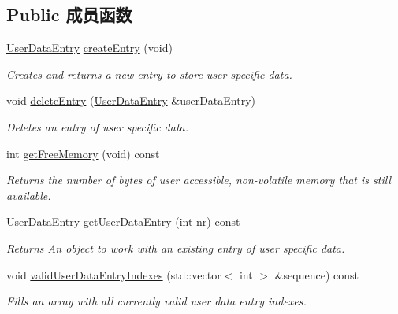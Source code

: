\subsection*{Public 成员函数}
\begin{DoxyCompactItemize}
\item 
\hyperlink{classmv_i_m_p_a_c_t_1_1acquire_1_1_user_data_entry}{User\+Data\+Entry} \hyperlink{classmv_i_m_p_a_c_t_1_1acquire_1_1_user_data_a693c8931c71b9911657636bd07ab1e09}{create\+Entry} (void)
\begin{DoxyCompactList}\small\item\em Creates and returns a new entry to store user specific data. \end{DoxyCompactList}\item 
void \hyperlink{classmv_i_m_p_a_c_t_1_1acquire_1_1_user_data_a5c3bcff4890369e8c8b446fa0344e7ed}{delete\+Entry} (\hyperlink{classmv_i_m_p_a_c_t_1_1acquire_1_1_user_data_entry}{User\+Data\+Entry} \&user\+Data\+Entry)
\begin{DoxyCompactList}\small\item\em Deletes an entry of user specific data. \end{DoxyCompactList}\item 
int \hyperlink{classmv_i_m_p_a_c_t_1_1acquire_1_1_user_data_ab1c2adb53dfe271c3ddeebf458a5a021}{get\+Free\+Memory} (void) const 
\begin{DoxyCompactList}\small\item\em Returns the number of bytes of user accessible, non-\/volatile memory that is still available. \end{DoxyCompactList}\item 
\hyperlink{classmv_i_m_p_a_c_t_1_1acquire_1_1_user_data_entry}{User\+Data\+Entry} \hyperlink{classmv_i_m_p_a_c_t_1_1acquire_1_1_user_data_a45146a280d80c00c39b435bd9b63a612}{get\+User\+Data\+Entry} (int nr) const 
\begin{DoxyCompactList}\small\item\em Returns An object to work with an existing entry of user specific data. \end{DoxyCompactList}\item 
void \hyperlink{classmv_i_m_p_a_c_t_1_1acquire_1_1_user_data_a80922fd3f90b3d292fd87760c41337d5}{valid\+User\+Data\+Entry\+Indexes} (std\+::vector$<$ int $>$ \&sequence) const 
\begin{DoxyCompactList}\small\item\em Fills an array with all currently valid user data entry indexes. \end{DoxyCompactList}\item 

\end{DoxyCompactItemize}

